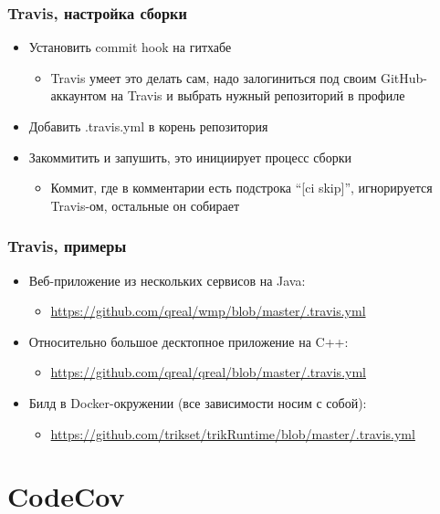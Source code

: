 \documentclass[xetex,mathserif,serif]{beamer}
\begin{document}
	\begin{frame}
		\frametitle{Travis, настройка сборки}
		\begin{itemize}
			\item Установить commit hook на гитхабе
			\begin{itemize}
				\item Travis умеет это делать сам, надо залогиниться под своим GitHub-аккаунтом на Travis и выбрать нужный репозиторий в профиле
			\end{itemize}
			\item Добавить .travis.yml в корень репозитория
			\item Закоммитить и запушить, это инициирует процесс сборки
			\begin{itemize}
				\item Коммит, где в комментарии есть подстрока ``[ci skip]'', игнорируется Travis-ом, остальные он собирает
			\end{itemize}
		\end{itemize}
	\end{frame}

	\begin{frame}
		\frametitle{Travis, примеры}
		\begin{itemize}
			\item Веб-приложение из нескольких сервисов на Java:
			\begin{itemize}
				\item \url{https://github.com/qreal/wmp/blob/master/.travis.yml}
			\end{itemize}
			\item Относительно большое десктопное приложение на C++:
			\begin{itemize}
				\item \url{https://github.com/qreal/qreal/blob/master/.travis.yml}
			\end{itemize}
			\item Билд в Docker-окружении (все зависимости носим с собой):
			\begin{itemize}
				\item \url{https://github.com/trikset/trikRuntime/blob/master/.travis.yml}
			\end{itemize}
		\end{itemize}
	\end{frame}

	\section{CodeCov}
\end{document}
